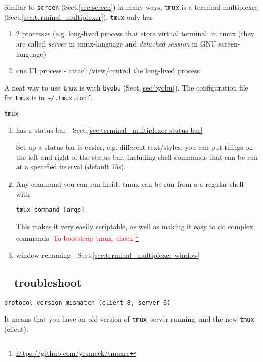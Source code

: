 Similar to \verb!screen! (Sect.\ref{sec:screen}) in many ways, \verb!tmux! is a
terminal multiplexer (Sect.\ref{sec:terminal_multiplexer}).
\verb!tmux! only has
\begin{enumerate}
  \item 2 processes (e.g. long-lived process that store virtual terminal: in
  tmux (they are called {\it server} in tmux-language and {\it detached session} in GNU screen-language)
  
  \item one UI process - attach/view/control the long-lived process
\end{enumerate}
A neat way to use \verb!tmux! is with \verb!byobu! (Sect.\ref{sec:byobu}). The
configuration file for \verb!tmux! is in \verb!~/.tmux.conf!.


\verb!tmux! 
\begin{enumerate}
  \item has a status bar  - Sect.\ref{sec:terminal_multiplexer-status-bar}
  
Set up a status bar is easier, e.g. different text/styles, you can put things on
the left and right of the status bar, including shell commands that can be run
at a specified interval (default 15s).
  
  \item  Any command you can run inside tmux can be run from a a regular shell
  with
\begin{verbatim}
tmux command [args]
\end{verbatim}

This makes it very easily scriptable, as well as making it easy to do complex
commands.
\textcolor{red}{To bootstrap tmux, check}
\footnote{\url{https://github.com/yesmeck/tmuxrc}}

  \item window renaming - Sect.\ref{sec:terminal_multiplexer-window}
\end{enumerate}


\subsection{-- troubleshoot}

\begin{verbatim}
protocol version mismatch (client 8, server 6)
\end{verbatim}

It means that you have an old version of \verb!tmux-!server running, and the new
\verb!tmux! (client). 


